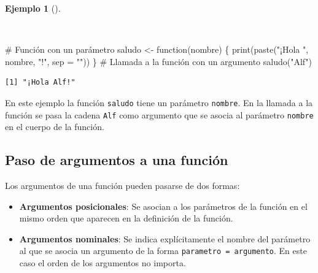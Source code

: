 \documentclass[
  a4paper,
]{scrreport}
\newenvironment{Shaded}{\begin{snugshade}}{\end{snugshade}}
\newcommand{\AttributeTok}[1]{\textcolor[rgb]{0.40,0.45,0.13}{#1}}
\newcommand{\CommentTok}[1]{\textcolor[rgb]{0.37,0.37,0.37}{#1}}
\newcommand{\ControlFlowTok}[1]{\textcolor[rgb]{0.00,0.23,0.31}{#1}}
\newcommand{\FunctionTok}[1]{\textcolor[rgb]{0.28,0.35,0.67}{#1}}
\newcommand{\NormalTok}[1]{\textcolor[rgb]{0.00,0.23,0.31}{#1}}
\newcommand{\OtherTok}[1]{\textcolor[rgb]{0.00,0.23,0.31}{#1}}
\newcommand{\StringTok}[1]{\textcolor[rgb]{0.13,0.47,0.30}{#1}}
\providecommand{\tightlist}{%
  \setlength{\itemsep}{0pt}\setlength{\parskip}{0pt}}\usepackage{longtable,booktabs,array}
\theoremstyle{definition}
\theoremstyle{definition}
\newtheorem{example}{Ejemplo}[chapter]
\theoremstyle{remark}
\begin{document}
\begin{example}[]\protect\hypertarget{exm-funcion-con-parametros}{}\label{exm-funcion-con-parametros}

~

\begin{Shaded}
\begin{Highlighting}[]
\CommentTok{\# Función con un parámetro}
\NormalTok{saludo }\OtherTok{\textless{}{-}} \ControlFlowTok{function}\NormalTok{(nombre) \{}
  \FunctionTok{print}\NormalTok{(}\FunctionTok{paste}\NormalTok{(}\StringTok{"¡Hola "}\NormalTok{, nombre, }\StringTok{"!"}\NormalTok{, }\AttributeTok{sep =} \StringTok{""}\NormalTok{))}
\NormalTok{\}}
\CommentTok{\# Llamada a la función con un argumento}
\FunctionTok{saludo}\NormalTok{(}\StringTok{"Alf"}\NormalTok{)}
\end{Highlighting}
\end{Shaded}

\begin{verbatim}
[1] "¡Hola Alf!"
\end{verbatim}

En este ejemplo la función \texttt{saludo} tiene un parámetro
\texttt{nombre}. En la llamada a la función se pasa la cadena
\texttt{Alf} como argumento que se asocia al parámetro \texttt{nombre}
en el cuerpo de la función.

\end{example}

\hypertarget{paso-de-argumentos-a-una-funciuxf3n}{%
\subsection{Paso de argumentos a una
función}\label{paso-de-argumentos-a-una-funciuxf3n}}

Los argumentos de una función pueden pasarse de dos formas:

\begin{itemize}
\tightlist
\item
  \textbf{Argumentos posicionales}: Se asocian a los parámetros de la
  función en el mismo orden que aparecen en la definición de la función.
\item
  \textbf{Argumentos nominales}: Se indica explícitamente el nombre del
  parámetro al que se asocia un argumento de la forma
  \texttt{parametro\ =\ argumento}. En este caso el orden de los
  argumentos no importa.
\end{itemize}
\end{document}

